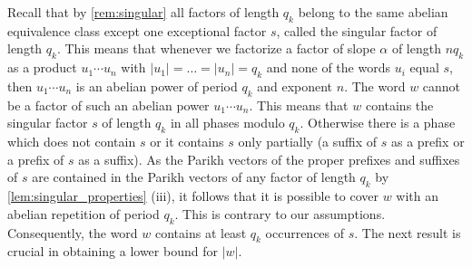 \documentclass[a4paper,fleqn]{article}
\providecommand{\abs}[1]{\lvert#1\rvert}
\begin{document}
  Recall that by \autoref{rem:singular} all factors of length $q_k$ belong to the same abelian equivalence class
  except one exceptional factor $s$, called the singular factor of length $q_k$. This means that whenever we factorize
  a factor of slope $\alpha$ of length $nq_k$ as a product $u_1 \cdots u_n$ with $\abs{u_1} = \ldots = \abs{u_n} = q_k$
  and none of the words $u_i$ equal $s$, then $u_1 \cdots u_n$ is an abelian power of period $q_k$ and exponent $n$.
  The word $w$ cannot be a factor of such an abelian power $u_1 \cdots u_n$. This means that $w$ contains the singular
  factor $s$ of length $q_k$ in all phases modulo $q_k$. Otherwise there is a phase which does not contain $s$ or it
  contains $s$ only partially (a suffix of $s$ as a prefix or a prefix of $s$ as a suffix). As the Parikh vectors of
  the proper prefixes and suffixes of $s$ are contained in the Parikh vectors of any factor of length $q_k$ by
  \autoref{lem:singular_properties} (iii), it follows that it is possible to cover $w$ with an abelian repetition of
  period $q_k$. This is contrary to our assumptions. Consequently, the word $w$ contains at least $q_k$ occurrences of
  $s$. The next result is crucial in obtaining a lower bound for $\abs{w}$.
   
\end{document}
